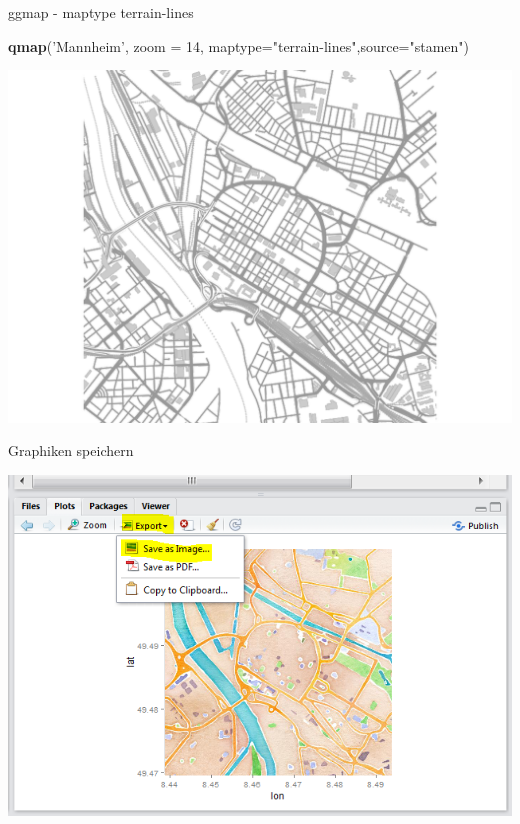 \documentclass[ignorenonframetext,]{beamer}
\newenvironment{Shaded}{}{}
\newcommand{\KeywordTok}[1]{\textcolor[rgb]{0.00,0.44,0.13}{\textbf{{#1}}}}
\newcommand{\DataTypeTok}[1]{\textcolor[rgb]{0.56,0.13,0.00}{{#1}}}
\newcommand{\DecValTok}[1]{\textcolor[rgb]{0.25,0.63,0.44}{{#1}}}
\newcommand{\StringTok}[1]{\textcolor[rgb]{0.25,0.44,0.63}{{#1}}}
\newcommand{\NormalTok}[1]{{#1}}
\begin{document}
\begin{frame}[fragile]{ggmap - maptype terrain-lines}

\begin{Shaded}
\begin{Highlighting}[]
\KeywordTok{qmap}\NormalTok{(}\StringTok{'Mannheim'}\NormalTok{, }\DataTypeTok{zoom =} \DecValTok{14}\NormalTok{,}
 \DataTypeTok{maptype=}\StringTok{"terrain-lines"}\NormalTok{,}\DataTypeTok{source=}\StringTok{"stamen"}\NormalTok{)}
\end{Highlighting}
\end{Shaded}

\includegraphics{R_intern_files/figure-beamer/unnamed-chunk-275-1.pdf}

\end{frame}

\begin{frame}{Graphiken speichern}

\includegraphics{./tex2pdf.956/eabdb869abc906d59fdf58e1d7099a3726da01e5.png}

\end{frame}
\end{document}
